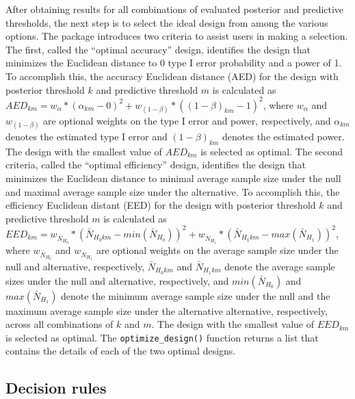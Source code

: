 After obtaining results for all combinations of evaluated posterior and
predictive thresholds, the next step is to select the ideal design from
among the various options. The  package introduces two
criteria to assist users in making a selection. The first, called the
``optimal accuracy'' design, identifies the design that minimizes the
Euclidean distance to 0 type I error probability and a power of 1. To
accomplish this, the accuracy Euclidean distance (AED) for the design
with posterior threshold \(k\) and predictive threshold \(m\) is
calculated as
\(AED_{km} = w_\alpha * (\alpha_{km} - 0)^2 + w_(1-\beta) * ((1-\beta)_{km}-1)^2\),
where \(w_\alpha\) and \(w_{(1-\beta)}\) are optional weights on the
type I error and power, respectively, and \(\alpha_{km}\) denotes the
estimated type I error and \((1-\beta)_{km}\) denotes the estimated
power. The design with the smallest value of \(AED_{km}\) is selected as
optimal. The second criteria, called the ``optimal efficiency'' design,
identifies the design that minimizes the Euclidean distance to minimal
average sample size under the null and maximal average sample size under
the alternative. To accomplish this, the efficiency Euclidean distant
(EED) for the design with posterior threshold \(k\) and predictive
threshold \(m\) is calculated as
\(EED_{km} = w_{\bar{N}_{H_0}} * (\bar{N}_{H_0km} - min(\bar{N}_{H_0}))^2 + w_{\bar{N}_{H_1}} * (\bar{N}_{H_1km}-max(\bar{N}_{H_1}))^2\),
where \(w_{\bar{N}_{H_0}}\) and \(w_{\bar{N}_{H_1}}\) are optional
weights on the average sample size under the null and alternative,
respectively, \(\bar{N}_{H_0km}\) and \(\bar{N}_{H_1km}\) denote the
average sample sizes under the null and alternative, respectively, and
\(min(\bar{N}_{H_0})\) and \(max(\bar{N}_{H_1})\) denote the minimum
average sample size under the null and the maximum average sample size
under the alternative alternative, respectively, across all combinations
of \(k\) and \(m\). The design with the smallest value of \(EED_{km}\)
is selected as optimal. The \texttt{optimize\_design()} function returns
a list that contains the details of each of the two optimal designs.

\hypertarget{decision-rules}{%
\subsection{Decision rules}\label{decision-rules}}

